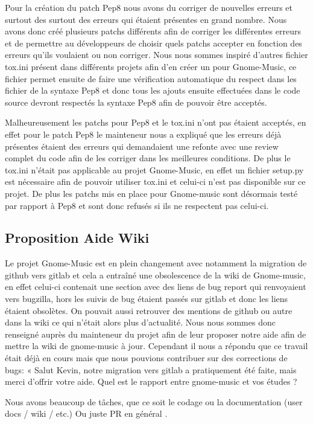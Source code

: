 \documentclass[12pt]{report}
\begin{document}
Pour la création du patch Pep8 nous avons du corriger de nouvelles erreurs et surtout des surtout des erreurs qui étaient présentes en grand nombre. Nous avons donc créé plusieurs patchs différents afin de corriger les différentes erreurs et de permettre au développeurs de choisir quels patchs accepter en fonction des erreurs qu’ils voulaient ou non corriger. Nous nous sommes inspiré d’autres fichier tox.ini présent dans différents projets afin d’en créer un pour Gnome-Music, ce fichier permet ensuite de faire une vérification automatique du respect dans les fichier de la syntaxe Pep8 et donc tous les ajouts ensuite effectuées dans le code source devront respectés la syntaxe Pep8 afin de pouvoir être acceptés.

Malheureusement les patchs pour Pep8 et le tox.ini n’ont pas étaient acceptés, en effet pour le patch Pep8 le mainteneur nous a expliqué que les erreurs déjà présentes étaient des erreurs qui demandaient une refonte avec une review complet du code afin de les corriger dans les meilleures conditions. De plus le tox.ini n’était pas applicable au projet Gnome-Music, en effet un fichier setup.py est nécessaire afin de pouvoir utiliser tox.ini et celui-ci n’est pas disponible sur ce projet. De plus les patchs mis en place pour Gnome-music sont désormais testé par rapport à Pep8 et sont donc refusés si ils ne respectent pas celui-ci.

\subsection{Proposition Aide Wiki}
Le projet Gnome-Music est en plein changement avec notamment la migration de github vers gitlab et cela a entraîné une obsolescence de la wiki de Gnome-music, en effet celui-ci contenait une section avec des liens de bug report qui renvoyaient vers bugzilla, hors les suivis de bug étaient passés sur gitlab et donc les liens étaient obsolètes. On pouvait aussi retrouver des mentions de github ou autre dans la wiki ce qui n’était alors plus d’actualité. Nous nous sommes donc renseigné auprès du mainteneur du projet afin de leur proposer notre aide afin de mettre la wiki de gnome-music à jour. Cependant il nous a répondu que ce travail était déjà en cours mais que nous pouvions contribuer sur des corrections de bugs:
« Salut Kevin, notre migration vers gitlab a pratiquement été faite, mais merci d'offrir votre aide. Quel est le rapport entre gnome-music et vos études ? 

Nous avons beaucoup de tâches, que ce soit le codage ou la documentation (user docs / wiki / etc.) Ou juste PR en général . 
\end{document}
